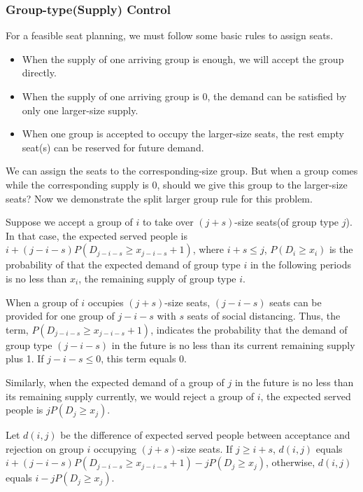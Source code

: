 \subsubsection{Group-type(Supply) Control}\label{nested_policy}

For a feasible seat planning, we must follow some basic rules to assign seats.
\begin{itemize}
    \item When the supply of one arriving group is enough, we will accept the group directly.
    \item When the supply of one arriving group is 0, the demand can be satisfied by only one larger-size supply.
    \item When one group is accepted to occupy the larger-size seats, the rest empty seat(s) can be reserved for future demand.
\end{itemize}

We can assign the seats to the corresponding-size group. But when a group comes while the corresponding supply is 0, should we give this group to the larger-size seats? Now we demonstrate the split larger group rule for this problem.

Suppose we accept a group of $i$ to take over $(j+s)$-size seats(of group type $j$). In that case, the expected served people is $i + (j-i-s)P(D_{j-i-s} \geq x_{j-i-s}+1)$, where $i+s \leq j$, $P(D_i \geq x_i)$ is the probability of that the expected demand of group type $i$ in the following periods is no less than $x_i$, the remaining supply of group type $i$.

When a group of $i$ occupies $(j+s)$-size seats, $(j-i-s)$ seats can be provided for one group of $j-i-s$ with $s$ seats of social distancing.
Thus, the term, $P(D_{j-i-s} \geq x_{j-i-s}+1)$, indicates the probability that the demand of group type $(j-i-s)$ in the future is no less than its current remaining supply plus 1. If $j -i- s \leq 0$, this term equals 0.

Similarly, when the expected demand of a group of $j$ in the future is no less than its remaining supply currently, we would reject a group of $i$, the expected served people is $j P(D_{j} \geq x_{j})$.

Let $d(i,j)$ be the difference of expected served people between acceptance and rejection on group $i$ occupying $(j+s)$-size seats. If $j \geq i+s$, $d(i,j)$ equals $i + (j-i-s)P(D_{j-i-s} \geq x_{j-i-s}+1) - j P(D_{j} \geq x_{j})$, otherwise, $d(i,j)$ equals $i - j P(D_{j} \geq x_{j})$.

